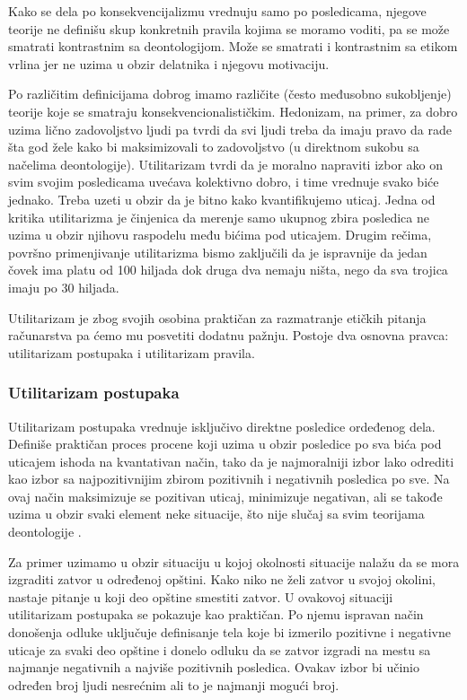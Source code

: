 \documentclass[a4paper]{article}
\begin{document}
Kako se dela po konsekvencijalizmu vrednuju samo po posledicama, njegove teorije ne definišu skup konkretnih pravila kojima se moramo voditi, pa se može smatrati kontrastnim sa deontologijom. Može se smatrati i kontrastnim sa etikom vrlina jer ne uzima u obzir delatnika i njegovu motivaciju. 

Po različitim definicijama dobrog imamo različite (često međusobno sukobljenje) teorije koje se smatraju konsekvencionalističkim. Hedonizam, na primer, za dobro uzima lično zadovoljstvo ljudi pa tvrdi da svi ljudi treba da imaju pravo da rade šta god žele kako bi maksimizovali to zadovoljstvo \cite{hedonism-iep} (u direktnom sukobu sa načelima deontologije). Utilitarizam tvrdi da je moralno napraviti izbor ako on svim svojim posledicama uvećava kolektivno dobro, i time vrednuje svako biće jednako. Treba uzeti u obzir da je bitno kako kvantifikujemo uticaj. Jedna od kritika utilitarizma je činjenica da merenje samo ukupnog zbira posledica ne uzima u obzir njihovu raspodelu među bićima pod uticajem. Drugim rečima, površno primenjivanje utilitarizma bismo zaključili da je ispravnije da jedan čovek ima platu od 100 hiljada dok druga dva nemaju ništa, nego da sva trojica imaju po 30 hiljada. 

Utilitarizam je zbog svojih osobina praktičan za razmatranje etičkih pitanja računarstva pa ćemo mu posvetiti dodatnu pažnju. Postoje dva osnovna pravca: utilitarizam postupaka i utilitarizam pravila. 

\subsubsection{Utilitarizam postupaka}
Utilitarizam postupaka vrednuje isključivo direktne posledice ordeđenog dela. Definiše praktičan proces procene koji uzima u obzir posledice po sva bića pod uticajem ishoda na kvantativan način, tako da je najmoralniji izbor lako odrediti kao izbor sa najpozitivnijim zbirom pozitivnih i negativnih posledica po sve. Na ovaj način maksimizuje se pozitivan uticaj, minimizuje negativan, ali se takođe uzima u obzir svaki element neke situacije, što nije slučaj sa svim teorijama deontologije \cite{quinn-ethics}. 

Za primer uzimamo u obzir situaciju u kojoj okolnosti situacije nalažu da se mora izgraditi zatvor u određenoj opštini. Kako niko ne želi zatvor u svojoj okolini, nastaje pitanje u koji deo opštine smestiti zatvor. U ovakovoj situaciji utilitarizam postupaka se pokazuje kao praktičan. Po njemu ispravan način donošenja odluke uključuje definisanje tela koje bi izmerilo pozitivne i negativne uticaje za svaki deo opštine i donelo odluku da se zatvor izgradi na mestu sa najmanje negativnih a najviše pozitivnih posledica. Ovakav izbor bi učinio određen broj ljudi nesrećnim ali to je najmanji mogući broj. 
\end{document}
